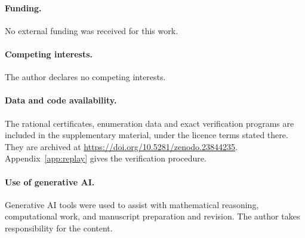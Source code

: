 \documentclass[11pt]{article}
\begin{document}
\paragraph{Funding.}
No external funding was received for this work.
\paragraph{Competing interests.}
The author declares no competing interests.
\paragraph{Data and code availability.}
The rational certificates, enumeration data and exact verification programs are included in the supplementary material, under the licence terms stated there. They are archived at \url{https://doi.org/10.5281/zenodo.23844235}. Appendix~\ref{app:replay} gives the verification procedure.
\paragraph{Use of generative AI.}
Generative AI tools were used to assist with mathematical reasoning, computational work, and manuscript preparation and revision. The author takes responsibility for the content.
\end{document}
